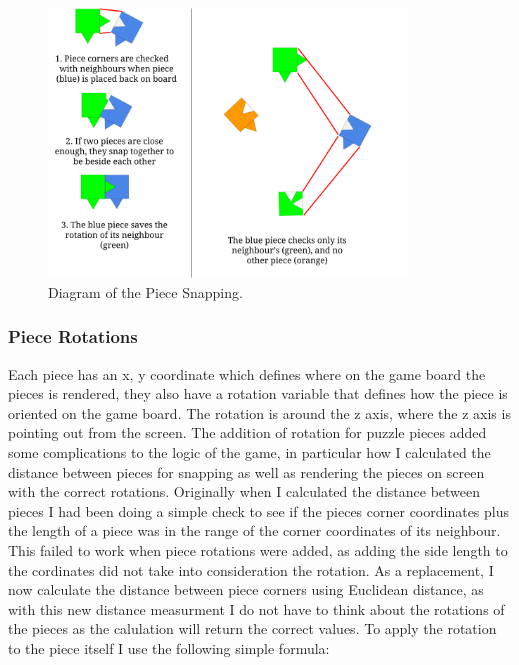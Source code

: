 \documentclass{article}
\begin{document}
\begin{figure}[ht]
\begin{center}
\includegraphics[width=0.85\textwidth, center]{images/PieceSnappingDiagram}
\caption{Diagram of the Piece Snapping.}
\label{fig:PieceSnapping}
\end{center}
\end{figure}

\subsubsection{Piece Rotations}
Each piece has an x, y coordinate which defines where on the game board the
pieces is rendered, they also have a rotation variable that defines how the
piece is oriented on the game board. The rotation is around the z axis, where
the z axis is pointing out from the screen. The addition of rotation for puzzle
pieces added some complications to the logic of the game, in particular how I
calculated the distance between pieces for snapping as well as rendering the
pieces on screen with the correct rotations. Originally when I calculated the
distance between pieces I had been doing a simple check to see if the pieces
corner coordinates plus the length of a piece was in the range of the corner
coordinates of its neighbour. This failed to work when piece rotations were
added, as adding the side length to the cordinates did not take into
consideration the rotation. As a replacement, I now calculate the distance
between piece corners using Euclidean distance, as with this new distance
measurment I do not have to think about the rotations of the pieces as the
calulation will return the correct values. To apply the rotation to the piece
itself I use the following simple formula:
\end{document}
